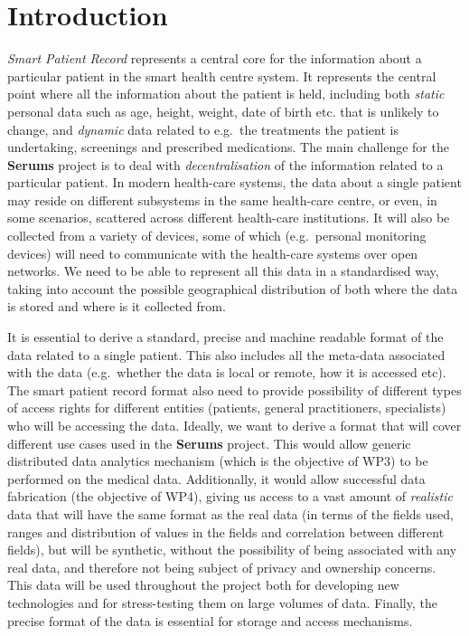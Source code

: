 \chapter{Introduction}
\label{chap:introduction}

\emph{Smart Patient Record} represents a central core for the information about a particular patient in the smart health centre system. It represents the central point where all the information about the patient is held, including both \emph{static} personal data such as age, height, weight, date of birth etc. that is unlikely to change, and \emph{dynamic} data related to e.g.~the treatments the patient is undertaking, screenings and prescribed medications. The main challenge for the \textbf{Serums} project is to deal with \emph{decentralisation} of the information related to a particular patient. In modern health-care systems, the data about a single patient may reside on different subsystems in the same health-care centre, or even, in some scenarios, scattered across different health-care institutions. It will also be collected from a variety of devices, some of which (e.g.~personal monitoring devices) will need to communicate with the health-care systems over open networks. We need to be able to represent all this data in a standardised way, taking into account the possible geographical distribution of both where the data is stored and where is it collected from.

It is essential to derive a standard, precise and machine readable format of the data related to a single patient. This also includes all the meta-data associated with the data (e.g.~whether the data is local or remote, how it is accessed etc). The smart patient record format also need to provide possibility of different types of access rights for different entities (patients, general practitioners, specialists) who will be accessing the data. Ideally, we want to derive a format that will cover different use cases used in the \textbf{Serums} project. This would allow generic distributed data analytics mechanism (which is the objective of WP3) to be performed on the medical data. Additionally, it would allow successful data fabrication (the objective of WP4), giving us access to a vast amount of \emph{realistic} data that will have the same format as the real data (in terms of the fields used, ranges and distribution of values in the fields and correlation between different fields), but will be synthetic, without the possibility of being associated with any real data, and therefore not being subject of privacy and ownership concerns. This data will be used throughout the project both for developing new technologies and for stress-testing them on large volumes of data. Finally, the precise format of the data is essential for storage and access mechanisms.

